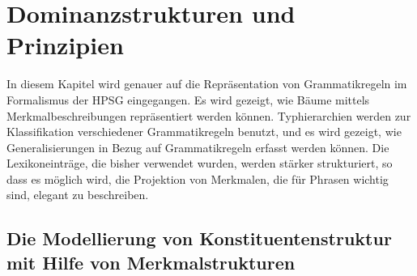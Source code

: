 

\chapter{Dominanzstrukturen und Prinzipien}
\label{chap-komplementation}

In diesem Kapitel wird genauer auf die Repräsentation von Grammatikregeln
im Formalismus der HPSG eingegangen. Es wird gezeigt, wie Bäume mittels Merkmalbeschreibungen
repräsentiert werden können. Typhierarchien werden zur Klassifikation verschiedener
Grammatikregeln benutzt, und es wird gezeigt, wie Generalisierungen in Bezug
auf Grammatikregeln erfasst werden können. Die Lexikoneinträge, die bisher verwendet wurden,
werden stärker strukturiert, so dass es möglich wird, die Projektion
von Merkmalen, die für Phrasen wichtig sind, elegant zu beschreiben. 

\section{Die Modellierung von Konstituentenstruktur mit Hilfe von Merkmalstrukturen}

